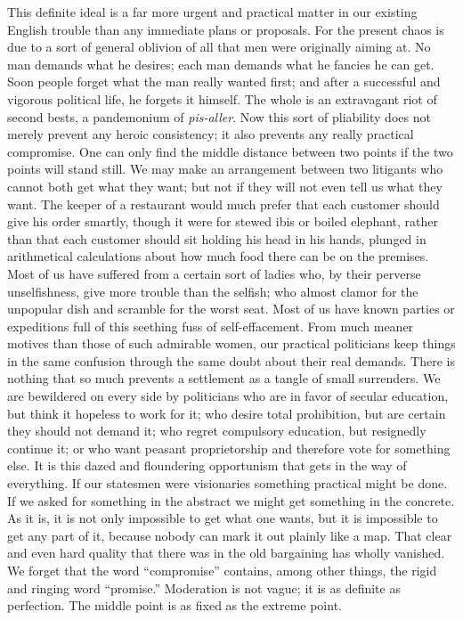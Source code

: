 \documentclass{book}
\begin{document}
This definite ideal is a far more urgent and practical matter in our existing English trouble than any immediate plans or proposals. For the present chaos is due to a sort of general oblivion of all that men were originally aiming at. No man demands what he desires; each man demands what he fancies he can get. Soon people forget what the man really wanted first; and after a successful and vigorous political life, he forgets it himself. The whole is an extravagant riot of second bests, a pandemonium of \emph{pis-aller}. Now this sort of pliability does not merely prevent any heroic consistency; it also prevents any really practical compromise. One can only find the middle distance between two points if the two points will stand still. We may make an arrangement between two litigants who cannot both get what they want; but not if they will not even tell us what they want. The keeper of a restaurant would much prefer that each customer should give his order smartly, though it were for stewed ibis or boiled elephant, rather than that each customer should sit holding his head in his hands, plunged in arithmetical calculations about how much food there can be on the premises. Most of us have suffered from a certain sort of ladies who, by their perverse unselfishness, give more trouble than the selfish; who almost clamor for the unpopular dish and scramble for the worst seat. Most of us have known parties or expeditions full of this seething fuss of self-effacement. From much meaner motives than those of such admirable women, our practical politicians keep things in the same confusion through the same doubt about their real demands. There is nothing that so much prevents a settlement as a tangle of small surrenders. We are bewildered on every side by politicians who are in favor of secular education, but think it hopeless to work for it; who desire total prohibition, but are certain they should not demand it; who regret compulsory education, but resignedly continue it; or who want peasant proprietorship and therefore vote for something else. It is this dazed and floundering opportunism that gets in the way of everything. If our statesmen were visionaries something practical might be done. If we asked for something in the abstract we might get something in the concrete. As it is, it is not only impossible to get what one wants, but it is impossible to get any part of it, because nobody can mark it out plainly like a map. That clear and even hard quality that there was in the old bargaining has wholly vanished. We forget that the word “compromise” contains, among other things, the rigid and ringing word “promise.” Moderation is not vague; it is as definite as perfection. The middle point is as fixed as the extreme point.
\end{document}
